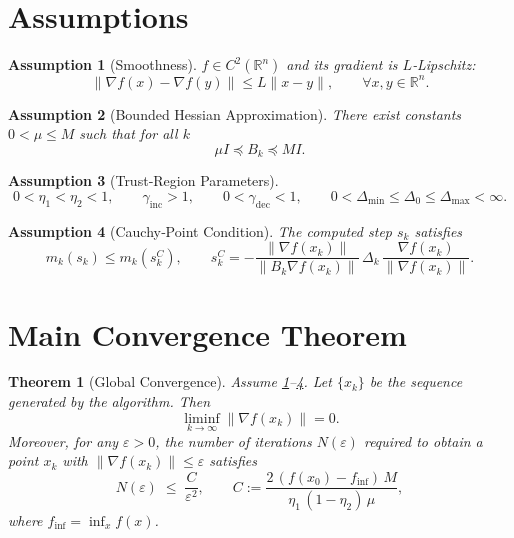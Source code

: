 \documentclass{article}
\newtheorem{assumption}{Assumption}
\newtheorem{theorem}{Theorem}
\newcommand{\RR}{\mathbb{R}}
\begin{document}
\newpage
\section*{Assumptions}
\begin{assumption}[Smoothness]\label{ass:smooth}
$f\in C^{2}(\RR^{n})$ and its gradient is $L$‑Lipschitz:
\[
\|\nabla f(x)-\nabla f(y)\|\le L\|x-y\|,\qquad\forall x,y\in\RR^{n}.
\tag{A1}
\]
\end{assumption}
\begin{assumption}[Bounded Hessian Approximation]\label{ass:hess}
There exist constants $0<\mu\le M$ such that for all $k$
\[
\mu I \preceq B_k \preceq M I .
\tag{A2}
\]
\end{assumption}
\begin{assumption}[Trust‑Region Parameters]\label{ass:params}
\[
0<\eta_1<\eta_2<1,\qquad
\gamma_{\text{inc}}>1,\qquad
0<\gamma_{\text{dec}}<1,\qquad
0<\Delta_{\min}\le \Delta_0\le\Delta_{\max}<\infty .
\tag{A3}
\]
\end{assumption}
\begin{assumption}[Cauchy‑Point Condition]\label{ass:cauchy}
The computed step $s_k$ satisfies
\[
m_k(s_k)\le m_k(s_k^{C}),\qquad
s_k^{C}= -\frac{\|\nabla f(x_k)\|}{\|B_k\nabla f(x_k)\|}\,\Delta_k\,
\frac{\nabla f(x_k)}{\|\nabla f(x_k)\|}.
\tag{A4}
\]
\end{assumption}

\section*{Main Convergence Theorem}
\begin{theorem}[Global Convergence]\label{thm:global}
Assume \ref{ass:smooth}–\ref{ass:cauchy}. Let $\{x_k\}$ be the sequence generated by the algorithm. Then
\[
\liminf_{k\to\infty}\|\nabla f(x_k)\|=0.
\]
Moreover, for any $\varepsilon>0$, the number of iterations $N(\varepsilon)$ required to obtain a point $x_k$ with $\|\nabla f(x_k)\|\le\varepsilon$ satisfies
\[
N(\varepsilon)\;\le\;
\frac{C}{\varepsilon^{2}},
\qquad
C:=\frac{2\,(f(x_0)-f_{\inf})\,M}{\eta_1\,(1-\eta_2)\,\mu},
\tag{T1}
\]
where $f_{\inf}=\inf_{x}f(x)$.
\end{theorem}
\end{document}
